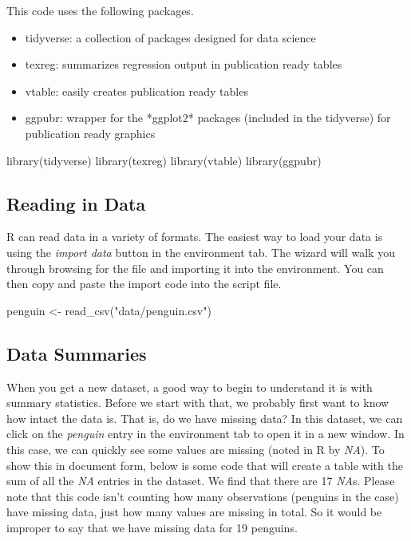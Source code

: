 \documentclass[
]{article}
\newenvironment{Shaded}{\begin{snugshade}}{\end{snugshade}}
\newcommand{\FunctionTok}[1]{\textcolor[rgb]{0.00,0.00,0.00}{#1}}
\newcommand{\NormalTok}[1]{#1}
\newcommand{\OtherTok}[1]{\textcolor[rgb]{0.56,0.35,0.01}{#1}}
\newcommand{\StringTok}[1]{\textcolor[rgb]{0.31,0.60,0.02}{#1}}
\begin{document}
This code uses the following packages.

\begin{itemize}
  \item tidyverse: a collection of packages designed for data science
  \item texreg: summarizes regression output in publication ready tables
  \item vtable: easily creates publication ready tables
  \item ggpubr: wrapper for the *ggplot2* packages (included in the tidyverse) for publication ready graphics
\end{itemize}

\begin{Shaded}
\begin{Highlighting}[]
\FunctionTok{library}\NormalTok{(tidyverse)}
\FunctionTok{library}\NormalTok{(texreg)}
\FunctionTok{library}\NormalTok{(vtable)}
\FunctionTok{library}\NormalTok{(ggpubr)}
\end{Highlighting}
\end{Shaded}

\hypertarget{reading-in-data}{%
\subsection{Reading in Data}\label{reading-in-data}}

R can read data in a variety of formats. The easiest way to load your
data is using the \emph{import data} button in the environment tab. The
wizard will walk you through browsing for the file and importing it into
the environment. You can then copy and paste the import code into the
script file.

\begin{Shaded}
\begin{Highlighting}[]
\NormalTok{penguin }\OtherTok{\textless{}{-}} \FunctionTok{read\_csv}\NormalTok{(}\StringTok{"data/penguin.csv"}\NormalTok{)}
\end{Highlighting}
\end{Shaded}

\hypertarget{data-summaries}{%
\subsection{Data Summaries}\label{data-summaries}}

When you get a new dataset, a good way to begin to understand it is with
summary statistics. Before we start with that, we probably first want to
know how intact the data is. That is, do we have missing data? In this
dataset, we can click on the \emph{penguin} entry in the environment tab
to open it in a new window. In this case, we can quickly see some values
are missing (noted in R by \emph{NA}). To show this in document form,
below is some code that will create a table with the sum of all the
\emph{NA} entries in the dataset. We find that there are 17 \emph{NA}s.
Please note that this code isn't counting how many observations
(penguins in the case) have missing data, just how many values are
missing in total. So it would be improper to say that we have missing
data for 19 penguins.\\
\pagebreak
\end{document}
